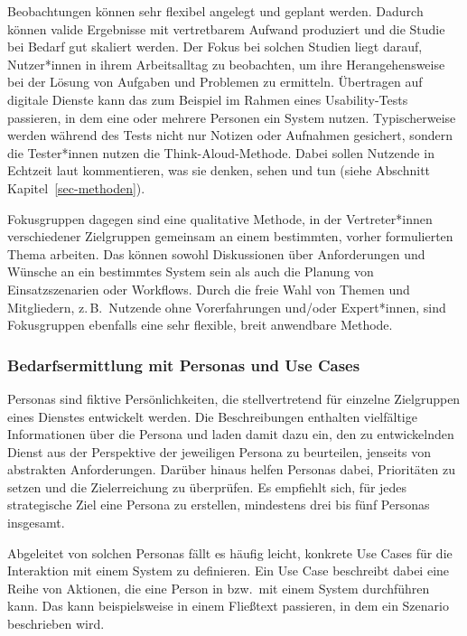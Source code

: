 \documentclass[
  11pt,
  letterpaper,
  DIV=11,
  twoside]{scrreprt}
\begin{document}
Beobachtungen können sehr flexibel angelegt und geplant werden. Dadurch
können valide Ergebnisse mit vertretbarem Aufwand produziert und die
Studie bei Bedarf gut skaliert werden. Der Fokus bei solchen Studien
liegt darauf, Nutzer*innen in ihrem Arbeitsalltag zu beobachten, um ihre
Herangehensweise bei der Lösung von Aufgaben und Problemen zu ermitteln.
Übertragen auf digitale Dienste kann das zum Beispiel im Rahmen eines
Usability-Tests passieren, in dem eine oder mehrere Personen ein System
nutzen. Typischerweise werden während des Tests nicht nur Notizen oder
Aufnahmen gesichert, sondern die Tester*innen nutzen die
Think-Aloud-Methode. Dabei sollen Nutzende in Echtzeit laut
kommentieren, was sie denken, sehen und tun (siehe Abschnitt
Kapitel~\ref{sec-methoden}).

Fokusgruppen dagegen sind eine qualitative Methode, in der
Vertreter*innen verschiedener Zielgruppen gemeinsam an einem bestimmten,
vorher formulierten Thema arbeiten. Das können sowohl Diskussionen über
Anforderungen und Wünsche an ein bestimmtes System sein als auch die
Planung von Einsatzszenarien oder Workflows. Durch die freie Wahl von
Themen und Mitgliedern, z.\,B.~Nutzende ohne Vorerfahrungen und/oder
Expert*innen, sind Fokusgruppen ebenfalls eine sehr flexible, breit
anwendbare Methode.

\subsubsection{Bedarfsermittlung mit Personas und Use
Cases}\label{bedarfsermittlung-mit-personas-und-use-cases}

Personas sind fiktive Persönlichkeiten, die stellvertretend für einzelne
Zielgruppen eines Dienstes entwickelt werden. Die Beschreibungen
enthalten vielfältige Informationen über die Persona und laden damit
dazu ein, den zu entwickelnden Dienst aus der Perspektive der jeweiligen
Persona zu beurteilen, jenseits von abstrakten Anforderungen. Darüber
hinaus helfen Personas dabei, Prioritäten zu setzen und die
Zielerreichung zu überprüfen. Es empfiehlt sich, für jedes strategische
Ziel eine Persona zu erstellen, mindestens drei bis fünf Personas
insgesamt.

Abgeleitet von solchen Personas fällt es häufig leicht, konkrete Use
Cases für die Interaktion mit einem System zu definieren. Ein Use Case
beschreibt dabei eine Reihe von Aktionen, die eine Person in bzw.~mit
einem System durchführen kann. Das kann beispielsweise in einem
Fließtext passieren, in dem ein Szenario beschrieben wird.
\end{document}
